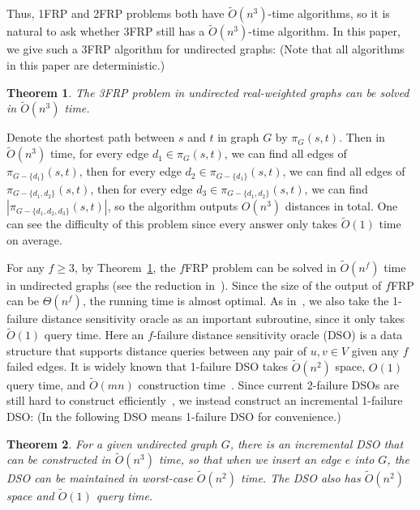 \documentclass[11pt]{article}
\theoremstyle{plain}
\newtheorem{theorem}{Theorem}[section]
\theoremstyle{definition}
\begin{document}
Thus, 1FRP and 2FRP problems both have $\tilde{O}(n^3)$-time algorithms, so it is natural to ask whether 3FRP still has a $\tilde{O}(n^3)$-time algorithm. In this paper, we give such a 3FRP algorithm for undirected graphs: (Note that all algorithms in this paper are deterministic.)

\begin{theorem}\label{thm:main1}
    The 3FRP problem in undirected real-weighted graphs can be solved in $\tilde{O}(n^3)$ time.
\end{theorem}

Denote the shortest path between $s$ and $t$ in graph $G$ by $\pi_G(s,t)$. Then in $\tilde{O}(n^3)$ time, for every edge $d_1\in \pi_G(s,t)$, we can find all edges of $\pi_{G-\{d_1\}}(s,t)$, then for every edge $d_2\in \pi_{G-\{d_1\}}(s,t)$, we can find all edges of $\pi_{G-\{d_1,d_2\}}(s,t)$, then for every edge $d_3\in \pi_{G-\{d_1,d_2\}}(s,t)$, we can find $|\pi_{G-\{d_1,d_2,d_3\}}(s,t)|$, so the algorithm outputs $O(n^3)$ distances in total. One can see the difficulty of this problem since every answer only takes $\tilde{O}(1)$ time on average.

For any $f\geq 3$, by Theorem~\ref{thm:main1}, the $f$FRP problem can be solved in $\tilde{O}(n^f)$ time in undirected graphs (see the reduction in~\cite{WWX22}). Since the size of the output of $f$FRP can be $\Theta(n^f)$, the running time is almost optimal. As in~\cite{WWX22}, we also take the 1-failure distance sensitivity oracle as an important subroutine, since it only takes $\tilde{O}(1)$ query time. Here an $f$-failure distance sensitivity oracle (DSO) is a data structure that supports distance queries between any pair of $u,v\in V$ given any $f$ failed edges. It is widely known that 1-failure DSO takes $\tilde{O}(n^2)$ space, $O(1)$ query time, and $\tilde{O}(mn)$ construction time~\cite{Demetrescu2008,2009A}. Since current 2-failure DSOs are still hard to construct efficiently~\cite{duan2009dual}, we instead construct an incremental 1-failure DSO: (In the following DSO means 1-failure DSO for convenience.)

\begin{theorem}
    For a given undirected graph $G$, there is an incremental DSO that can be constructed in $\tilde{O}(n^3)$ time, so that when we insert an edge $e$ into $G$, the DSO can be maintained in worst-case $\tilde{O}(n^2)$ time. The DSO also has $\tilde{O}(n^2)$ space and $\tilde{O}(1)$ query time.
\end{theorem}
\end{document}
